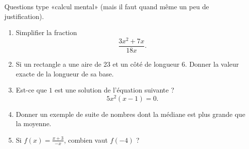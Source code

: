 
\begin{exercice}\label{exosmath-0571}

    Questions type «calcul mental» (mais il faut quand même un peu de justification).
    \begin{enumerate}
        \item
            Simplifier la fraction
            \begin{equation*}
                \frac{ 3x^2+7x }{ 18x }.
            \end{equation*}
        \item
            Si un rectangle a une aire de \unit{23}{\centi\square\meter} et un côté de longueur \unit{6}{\centi\meter}. Donner la valeur exacte de la longueur de sa base.
        \item
            Est-ce que \( 1\) est une solution de l'équation suivante ?
            \begin{equation}
                5x^2(x-1)=0.
            \end{equation}
        \item
            Donner un exemple de suite de nombres dont la médiane est plus grande que la moyenne.
        \item 
            Si \( f(x)=\frac{ x+3 }{ -x }\), combien vaut \( f(-4)\) ?
    \end{enumerate}

\end{exercice}
